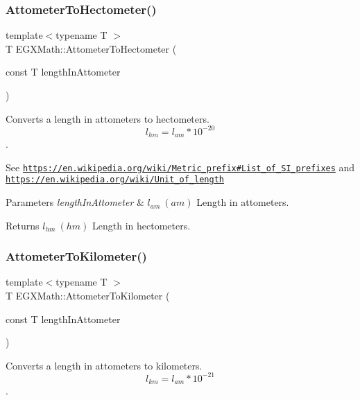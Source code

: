 \subsubsection{\texorpdfstring{Attometer\+To\+Hectometer()}{AttometerToHectometer()}}
{\footnotesize\ttfamily template$<$typename T $>$ \\
T E\+G\+X\+Math\+::\+Attometer\+To\+Hectometer (\begin{DoxyParamCaption}\item[{const T}]{length\+In\+Attometer }\end{DoxyParamCaption})}



Converts a length in attometers to hectometers. \[ l_{hm}=l_{am} * 10^{-20} \]. 

See \href{https://en.wikipedia.org/wiki/Metric_prefix#List_of_SI_prefixes}{\tt https\+://en.\+wikipedia.\+org/wiki/\+Metric\+\_\+prefix\#\+List\+\_\+of\+\_\+\+S\+I\+\_\+prefixes} and \href{https://en.wikipedia.org/wiki/Unit_of_length}{\tt https\+://en.\+wikipedia.\+org/wiki/\+Unit\+\_\+of\+\_\+length} 
\begin{DoxyParams}{Parameters}
{\em length\+In\+Attometer} & $ l_{am}\ (am)$ Length in attometers. \\
\hline
\end{DoxyParams}
\begin{DoxyReturn}{Returns}
$ l_{hm}\ (hm)$ Length in hectometers. 
\end{DoxyReturn}
\mbox{\label{group___e_g_x_math-_conversions-_length_conversions-_s_i-_attometer-_s_i_gafc247d0f5b16a1e83c2f210812ee41e8}} 
\subsubsection{\texorpdfstring{Attometer\+To\+Kilometer()}{AttometerToKilometer()}}
{\footnotesize\ttfamily template$<$typename T $>$ \\
T E\+G\+X\+Math\+::\+Attometer\+To\+Kilometer (\begin{DoxyParamCaption}\item[{const T}]{length\+In\+Attometer }\end{DoxyParamCaption})}



Converts a length in attometers to kilometers. \[ l_{km}=l_{am} * 10^{-21} \]. 

